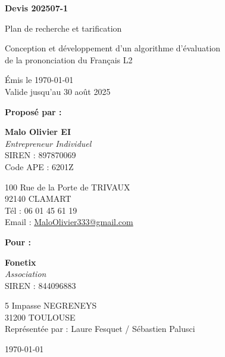 \documentclass[11pt,a4paper]{article}
\begin{document}
\begin{titlepage}
    \centering
    
    \vspace{2cm}
    
    {\Huge\bfseries\color{BLUE} Devis 202507-1}
    
    \vspace{0.5cm}
    {\Large Plan de recherche et tarification}
    
    \vspace{0.3cm}
    {\large Conception et développement d'un algorithme d'évaluation \\
    de la prononciation du Français L2}

    \vspace{0.8cm}
    {Émis le \today \\}
    \vspace{0.2cm}
    {Valide jusqu'au 30 août 2025}
    
    \vspace{3cm}
    
    \begin{minipage}{0.8\textwidth}
        \centering
        \textbf{\Large Proposé par :}
        
        \vspace{0.5cm}
        \textbf{Malo Olivier EI}\\
        \textit{Entrepreneur Individuel}\\
        SIREN : 897870069\\
        Code APE : 6201Z
        
        \vspace{0.3cm}
        100 Rue de la Porte de TRIVAUX\\
        92140 CLAMART\\
        Tél : 06 01 45 61 19\\
        Email : \href{mailto:MaloOlivier333@gmail.com}{MaloOlivier333@gmail.com}
    \end{minipage}
    
    \vspace{2cm}
    
    \begin{minipage}{0.8\textwidth}
        \centering
        \textbf{\Large Pour :}
        
        \vspace{0.5cm}
        \textbf{Fonetix}\\
        \textit{Association}\\
        SIREN : 844096883
        
        \vspace{0.3cm}
        5 Impasse NEGRENEYS\\
        31200 TOULOUSE\\
        Représentée par : Laure Fesquet / Sébastien Palusci
    \end{minipage}
    
    \vfill
    
    {\large \today}
    
\end{titlepage}
\end{document}
